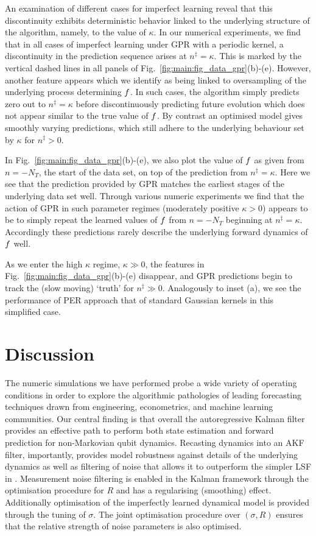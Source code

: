 An examination of different cases for imperfect learning reveal that this discontinuity exhibits deterministic behavior linked to the underlying structure of the algorithm, namely, to the value of $\kappa$. In our numerical experiments, we find that in all cases of imperfect learning under GPR with a periodic kernel, a discontinuity in the prediction sequence arises at  $n^\ddagger = \kappa$. This is marked by the vertical dashed lines in all panels of Fig.~\ref{fig:main:fig_data_gpr}(b)-(e).  However, another feature appears which we identify as being linked to oversampling of the underlying process determining $f$.  In such cases, the algorithm simply predicts zero out to $n^\ddagger=\kappa$ before discontinuously predicting future evolution which does not appear similar to the true value of $f$.  By contrast an optimised model gives smoothly varying predictions, which still adhere to the underlying behaviour set by $\kappa$ for $n^\ddagger>0$. 

In Fig.~\ref{fig:main:fig_data_gpr}(b)-(e), we also plot the value of $f$ as given from $n=-N_{T}$, the start of the data set, on top of the prediction from $n^\ddagger=\kappa$.  Here we see that the prediction provided by GPR matches the earliest stages of the underlying data set well.  Through various numeric experiments we find that the action of GPR in such parameter regimes (moderately positive $\kappa >0$) appears to be to simply repeat the learned values of $f$ from $n=-N_{T}$ beginning at $n^\ddagger=\kappa$.  Accordingly these predictions rarely describe the underlying forward dynamics of $f$ well. 

As we enter the high $\kappa$ regime,  $\kappa  \gg 0$, the features in Fig.~\ref{fig:main:fig_data_gpr}(b)-(e) disappear, and GPR predictions begin to track the (slow moving) `truth' for $n^\ddagger \gg 0$. Analogously to inset (a), we see the performance of PER approach that of standard Gaussian kernels in this simplified case.



\section{Discussion} \label{sec:main:discussion}
The numeric simulations we have performed probe a wide variety of operating conditions in order to explore the algorithmic pathologies of leading forecasting techniques drawn from engineering, econometrics, and machine learning communities.  Our central finding is that overall the autoregressive Kalman filter provides an effective path to perform both state estimation and forward prediction for non-Markovian qubit dynamics. Recasting dynamics into an AKF filter, importantly, provides model robustness against details of the underlying dynamics as well as filtering of noise that allows it to outperform the simpler LSF in \cite{mavadia2017}.  Measurement noise filtering is enabled in the Kalman framework through the optimisation procedure for $R$ and has a regularising (smoothing) effect. Additionally optimisation of the imperfectly learned dynamical model is provided through the tuning of $\sigma$. The joint optimisation procedure over $(\sigma, R)$ ensures that the relative strength of noise parameters is also optimised.  

